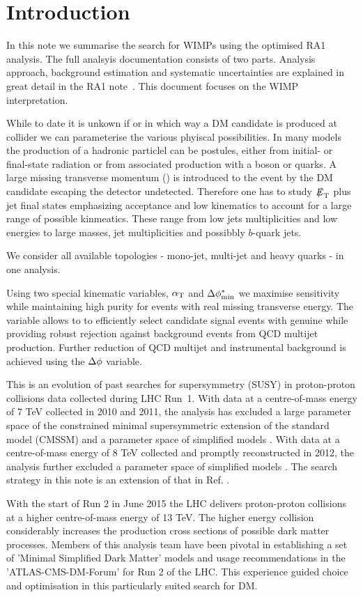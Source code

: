 \section{Introduction}
\label{sec:intro}

In this note we summarise the search for WIMPs using the optimised RA1 analysis. The full analsyis documentation consists of two parts. Analysis approach, background estimation and systematic uncertainties are explained in great detail in the RA1 note~\cite{alphaTnote}. This document focuses on the WIMP interpretation.

While to date it is unkown if or in which way a DM candidate is produced at collider we can parameterise the various phyiscal possibilities. In many models the production of a hadronic particlel can be postules, either from initial- or final-state radiation or from associated production with a boson or quarks.
A large missing transverse momentum (\MET) is introduced to the event by the DM candidate escaping the detector undetected. Therefore one has to study $\etmiss$ plus jet final states emphasizing acceptance and low kinematics to account for a large range of possible kinmeatics. These range from low jets multiplicities and low energies to large masses, jet multiplicities and possibbly $b$-quark jets.

We consider all available topologies - mono-jet, multi-jet and heavy quarks - in one analysis. 

Using two special kinematic variables,  $\alpha_{\textrm T}$ and $\mbox{$\Delta\phi^{*}_{\rm min}$}$ we maximise sensitivity while maintaining high purity for events with real missing transverse energy.
The \alphat variable allows to to efficiently select candidate signal events with genuine \MET while
providing robust rejection against background events from QCD multijet production. Further reduction of QCD multijet and instrumental background is achieved using the $\Delta \phi$ variable.

This is an evolution of past searches for supersymmetry (SUSY) in proton-proton collisions data collected during LHC Run~1. With data at a centre-of-mass energy of 7 TeV collected in 2010 and 2011, the \alphat analysis has excluded a large parameter space of the constrained minimal supersymmetric extension of the standard model (CMSSM) \cite{Khachatryan:2011tk, Chatrchyan:2011zy, Chatrchyan:2012wa} and a parameter space of simplified models \cite{Chatrchyan:2012wa}. With data at a centre-of-mass energy of 8 TeV collected and promptly reconstructed in 2012, the \alphat analysis
further excluded a parameter space of simplified models \cite{Chatrchyan:2013lya}.  The search strategy in this note is an extension of that in Ref. \cite{CMS_AN_2013-366}.

With the start of Run 2 in June 2015 the LHC delivers proton-proton collisions at a higher centre-of-mass energy of 13 TeV. The higher energy collision considerably increases the production cross sections of possible dark matter processes. Members of this analysis team have been pivotal in establishing a set of 'Minimal Simplified Dark Matter' models and usage recommendations in the 'ATLAS-CMS-DM-Forum' for Run 2 of the LHC. This experience guided choice and optimisation in this particularly suited search for DM.
